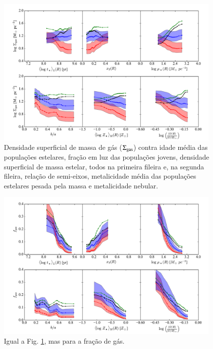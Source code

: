 \begin{figure}
	\centering
	\includegraphics[width=0.99\textwidth]{figuras/props_SigmaGas.pdf}
	\caption[Propriedades físicas e $\SigmaGas$.]
	{Densidade superficial de massa de gás ($\SigmaGas$) contra idade média das populações estelares,
fração em luz das populações jovens, densidade superficial de massa estelar, todos na primeira
fileira e, na segunda fileira, relação de semi-eixos, metalicidade média das populações estelares
pesada pela massa e metalicidade nebular. }
	\label{fig:propsSigmaGas}
\end{figure}
\begin{figure}
	\centering
	\includegraphics[width=0.99\textwidth]{figuras/props_fGas.pdf}
	\caption[Propriedades físicas e $f_{\mathrm{gas}}$.]
	{Igual a Fig. \ref{fig:propsSigmaGas}, mas para a fração de gás.}
	\label{fig:propsfGas}
\end{figure} 

